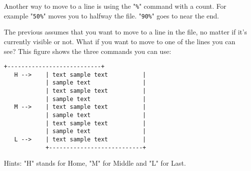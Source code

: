 Another way to move to a line is using the "\texttt{\%}" command with a count. 
For example "\texttt{50\%}" moves you to halfway the file.
"\texttt{90\%}" goes to near the end.

The previous assumes that you want to move to a line in the file, no matter if it's currently visible or not.
What if you want to move to one of the lines you can see?
This figure shows the three commands you can use:

\begin{Verbatim}[samepage=true]
            +---------------------------+
   H -->    | text sample text          |
            | sample text               |
            | text sample text          |
            | sample text               |
   M -->    | text sample text          |
            | sample text               |
            | text sample text          |
            | sample text               |
   L -->    | text sample text          |
            +---------------------------+
\end{Verbatim}

Hints: "H" stands for Home, "M" for Middle and "L" for Last.

